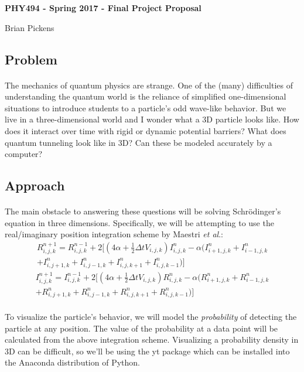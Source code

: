 \documentclass[11pt, letterpaper]{article}
\begin{document}
 
\centerline{\textbf{\Large PHY494 - Spring 2017 - Final Project Proposal}}
\centerline{\large Brian Pickens}
\hfill
\subsection*{Problem}
\paragraph{} The mechanics of quantum physics are strange. One of the (many) difficulties of understanding the quantum world is the reliance of simplified one-dimensional situations to introduce students to a particle's odd wave-like behavior. But we live in a three-dimensional world and I wonder what a 3D particle looks like. How does it interact over time with rigid or dynamic potential barriers? What does quantum tunneling look like in 3D? Can these be modeled accurately by a computer?

\subsection*{Approach}
\paragraph{} The main obstacle to answering these questions will be solving Schr\"odinger's equation in three dimensions. Specifically, we will be attempting to use the real/imaginary position integration scheme by Maestri \textit{et al}.:
\begin{multline}
R^{n+1}_{i,j,k} = R^{n-1}_{i,j,k} + 2[(4\alpha + \frac{1}{2}\Delta tV_{i,j,k})I^n_{i,j,k} - \alpha (I^{n}_{i+1,j,k} + I^{n}_{i-1,j,k}\\ + I^{n}_{i,j+1,k} + I^{n}_{i,j-1,k} + I^{n}_{i,j,k+1} + I^{n}_{i,j,k-1})]
\end{multline}
\begin{multline}
I^{n+1}_{i,j,k} = I^{n-1}_{i,j,k} + 2[(4\alpha + \frac{1}{2}\Delta tV_{i,j,k})R^n_{i,j,k} - \alpha (R^{n}_{i+1,j,k} + R^{n}_{i-1,j,k}\\ + R^{n}_{i,j+1,k} + R^{n}_{i,j-1,k} + R^{n}_{i,j,k+1} + R^{n}_{i,j,k-1})]
\end{multline}
\paragraph{} To visualize the particle's behavior, we will model the \textit{probability} of detecting the particle at any position. The value of the probability at a data point will be calculated from the above integration scheme. Visualizing a probability density in 3D can be difficult, so we'll be using the yt package which can be installed into the Anaconda distribution of Python.
\end{document}
